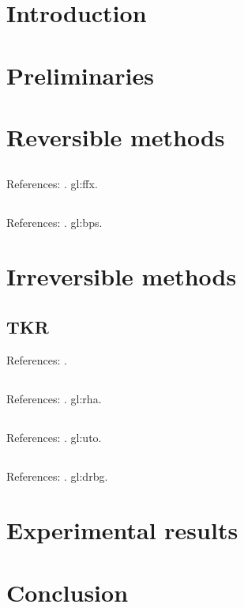 \documentclass[11pt]{article}
\begin{document}
  \section{Introduction}

  \section{Preliminaries}

  \section{Reversible methods}

  \subsection{}

  References: \cite{ffx_1, ffx_2, sinopsis_rogaway}. \Gls{gl:ffx}.

  \subsection{}

  References: \cite{bps}. \Gls{gl:bps}.

  \section{Irreversible methods}

  \subsection{TKR}

  References: \cite{doc_sandra}.

  \subsection{}

  References: \cite{aragona}. \Gls{gl:rha}.

  \subsection{}

  References: \cite{DBLP:conf/fc/CachinCFL17}. \Gls{gl:uto}.

  \subsection{}

  References: \cite{nist_aleatorios}. \Gls{gl:drbg}.

  \section{Experimental results}

  \section{Conclusion}

  \printbibliography
\end{document}
